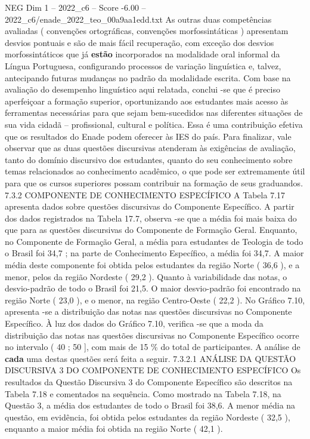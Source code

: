 \begin{textsample}{NEG Dim 1 – 2022\_c6 – Score -6.00 – 2022\_c6/enade\_2022\_teo\_00a9aa1edd.txt}
As outras duas competências avaliadas ( convenções ortográficas, convenções morfossintáticas ) apresentam desvios pontuais e são de mais fácil recuperação, com exceção dos desvios morfossintáticos que já \textbf{estão} incorporados na modalidade oral informal da Língua Portuguesa, configurando processos de variação linguística e, talvez, antecipando futuras mudanças no padrão da modalidade escrita.
Com base na avaliação do desempenho linguístico aqui relatada, conclui -se que é preciso aperfeiçoar a formação superior, oportunizando aos estudantes mais acesso às ferramentas necessárias para que sejam bem-sucedidos nas diferentes situações de sua vida cidadã – profissional, cultural e política.
Essa é uma contribuição efetiva que os resultados do Enade podem oferecer às IES do país.
Para finalizar, vale observar que as duas questões discursivas atenderam às exigências de avaliação, tanto do domínio discursivo dos estudantes, quanto do seu conhecimento sobre temas relacionados ao conhecimento acadêmico, o que pode ser extremamente útil para que os cursos superiores possam contribuir na formação de seus graduandos. 7.3.2 COMPONENTE DE CONHECIMENTO ESPECÍFICO A Tabela 7.17 apresenta dados sobre questões discursivas do Componente Específico.
A partir dos dados registrados na Tabela 17.7, observa -se que a média foi mais baixa do que para as questões discursivas do Componente de Formação Geral.
Enquanto, no Componente de Formação Geral, a média para estudantes de Teologia de todo o Brasil foi 34,7 ; na parte de Conhecimento Específico, a média foi 34,7.
A maior média deste componente foi obtida pelos estudantes da região Norte ( 36,6 ), e a menor, pelos da região Nordeste ( 29,2 ).
Quanto à variabilidade das notas, o desvio-padrão de todo o Brasil foi 21,5.
O maior desvio-padrão foi encontrado na região Norte ( 23,0 ), e o menor, na região Centro-Oeste ( 22,2 ).
No Gráfico 7.10, apresenta -se a distribuição das notas nas questões discursivas no Componente Específico.
À luz dos dados do Gráfico 7.10, verifica -se que a moda da distribuição das notas nas questões discursivas no Componente Específico ocorre no intervalo ( 40 ; 50 ], com mais de 15 \% do total de participantes.
A análise de \textbf{cada} uma destas questões será feita a seguir. 7.3.2.1 ANÁLISE DA QUESTÃO DISCURSIVA 3 DO COMPONENTE DE CONHECIMENTO ESPECÍFICO Os resultados da Questão Discursiva 3 do Componente Específico são descritos na Tabela 7.18 e comentados na sequência.
Como mostrado na Tabela 7.18, na Questão 3, a média dos estudantes de todo o Brasil foi 38,6.
A menor média na questão, em evidência, foi obtida pelos estudantes da região Nordeste ( 32,5 ), enquanto a maior média foi obtida na região Norte ( 42,1 ).

\end{textsample}
